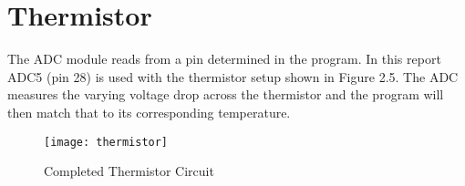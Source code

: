 \documentclass[main.tex]{subfiles}
\begin{document}
	\section{Thermistor}
	The ADC module reads from a pin determined in the program. In this report ADC5 (pin 28) is used
	with the thermistor setup shown in Figure 2.5. The ADC measures the varying voltage drop
	across the thermistor and the program will then match that to its corresponding temperature.
	
	\begin{figure}[H]
		\begin{center}
			\texttt{[image: thermistor]}
		\end{center}
		\caption{Completed Thermistor Circuit}
		\label{fig:therm}
	\end{figure}
\end{document}
